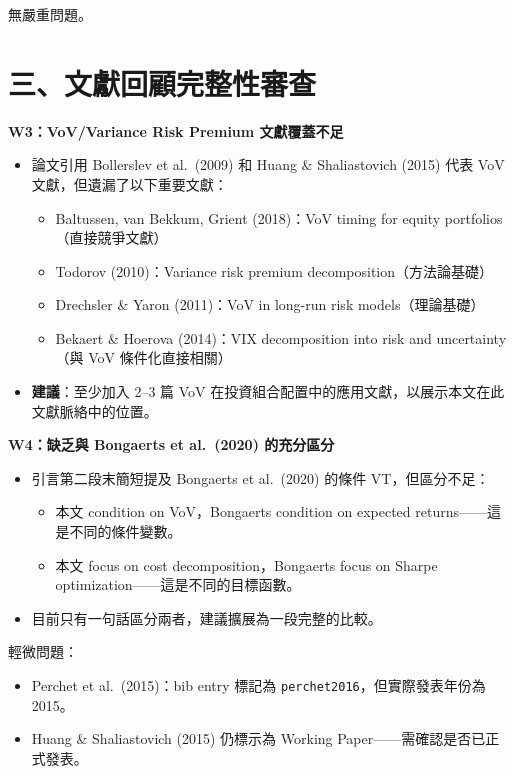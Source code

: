 \documentclass[12pt,a4paper]{article}
\begin{document}
無嚴重問題。

\section*{三、文獻回顧完整性審查}

\textcolor{warncolor}{\textbf{W3：VoV/Variance Risk Premium 文獻覆蓋不足}}

\begin{itemize}[leftmargin=2em]
\item 論文引用 Bollerslev et al.\ (2009) 和 Huang \& Shaliastovich (2015) 代表 VoV 文獻，但遺漏了以下重要文獻：
  \begin{itemize}
  \item Baltussen, van Bekkum, Grient (2018)：VoV timing for equity portfolios（直接競爭文獻）
  \item Todorov (2010)：Variance risk premium decomposition（方法論基礎）
  \item Drechsler \& Yaron (2011)：VoV in long-run risk models（理論基礎）
  \item Bekaert \& Hoerova (2014)：VIX decomposition into risk and uncertainty（與 VoV 條件化直接相關）
  \end{itemize}
\item \textbf{建議}：至少加入 2--3 篇 VoV 在投資組合配置中的應用文獻，以展示本文在此文獻脈絡中的位置。
\end{itemize}

\textcolor{warncolor}{\textbf{W4：缺乏與 Bongaerts et al.\ (2020) 的充分區分}}

\begin{itemize}[leftmargin=2em]
\item 引言第二段末簡短提及 Bongaerts et al.\ (2020) 的條件 VT，但區分不足：
  \begin{itemize}
  \item 本文 condition on VoV，Bongaerts condition on expected returns——這是不同的條件變數。
  \item 本文 focus on cost decomposition，Bongaerts focus on Sharpe optimization——這是不同的目標函數。
  \end{itemize}
\item 目前只有一句話區分兩者，建議擴展為一段完整的比較。
\end{itemize}

輕微問題：

\begin{itemize}[leftmargin=2em]
\item Perchet et al.\ (2015)：bib entry 標記為 \texttt{perchet2016}，但實際發表年份為 2015。
\item Huang \& Shaliastovich (2015) 仍標示為 Working Paper——需確認是否已正式發表。
\end{itemize}
\end{document}
